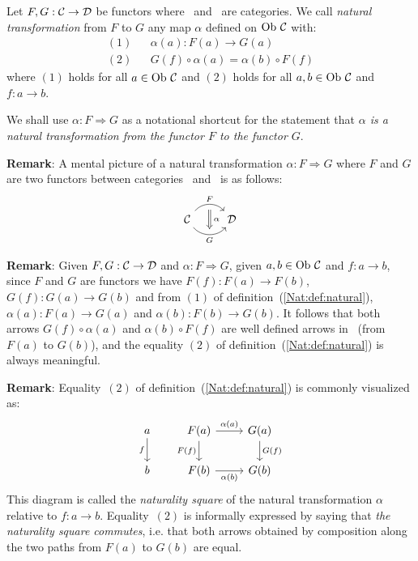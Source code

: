 \begin{defin}\label{Nat:def:natural}
    Let $F,G:\mbox{$\cal C$}\to\mbox{$\cal D$}$ be functors where \Cat\ and \Dat\ are categories.
    We call {\em natural transformation} from $F$ to $G$ any map $\alpha$
    defined on $\mbox{\rm Ob}\ \mbox{$\cal C$}$ with:
        \begin{eqnarray*}
            (1)& &\alpha(a) : F(a) \to G(a)\\
            (2)& &G(f)\circ\alpha(a) = \alpha(b) \circ F(f)
        \end{eqnarray*}
    where $(1)$ holds for all $a\in\mbox{\rm Ob}\ \mbox{$\cal C$}$ and $(2)$ holds for all 
    $a,b\in\mbox{\rm Ob}\ \mbox{$\cal C$}$ and $f:a\to b$.
\end{defin}

\begin{notation}\label{Nat:notation:natural:arrow}
    We shall use $\alpha:F\Rightarrow G$ as a notational shortcut for the
    statement that {\em $\alpha$ is a natural transformation from the
    functor $F$ to the functor $G$}.
\end{notation}

\noindent
{\bf Remark}: A mental picture of a natural transformation $\alpha:F\Rightarrow 
G$ where $F$ and $G$ are two functors between categories \Cat\ and \Dat\ is as 
follows:
    \[
        \begin{tikzcd}
            \Cat \arrow[r, "F", bend left  = 50, ""{name=U, below}]
                 \arrow[r, swap, "G", bend right = 50, ""{name=D, above}]
              & \Dat
            \arrow[Rightarrow, "\,\alpha", from = U, to = D]
        \end{tikzcd}
    \]

\noindent
{\bf Remark}: Given $F,G:\mbox{$\cal C$}\to\mbox{$\cal D$}$ and $\alpha:F\Rightarrow G$, given
$a,b\in\mbox{\rm Ob}\ \mbox{$\cal C$}$ and $f:a \to b$, since $F$ and $G$ are functors we have 
$F(f):F(a) \to F(b)$, $G(f):G(a)\to G(b)$ and from $(1)$ of 
definition~(\ref{Nat:def:natural}), $\alpha(a):F(a)\to G(a)$ and 
$\alpha(b):F(b)\to G(b)$. It follows that both arrows $G(f)\circ\alpha(a)$ 
and $\alpha(b)\circ F(f)$ are well defined arrows in \Dat\ (from $F(a)$ to 
$G(b)$), and the equality $(2)$ of definition~(\ref{Nat:def:natural}) is 
always meaningful.

\noindent
{\bf Remark}: Equality~$(2)$ of definition~(\ref{Nat:def:natural}) is commonly
visualized as: 
    \[
        \begin{tikzcd}
            a\arrow[d,swap, "f"]
            &F(a)\arrow[r, "\alpha(a)"]\arrow[d, swap,"F(f)"]
            &G(a)\arrow[d, "G(f)"]
            \\
            b
            &F(b)\arrow[r, swap, "\alpha(b)"]
            &G(b)
        \end{tikzcd}
    \]
This diagram is called the {\em naturality square} of the
natural transformation $\alpha$ relative to $f:a \to b$. Equality~$(2)$
is informally expressed by saying that {\em the naturality square commutes},
i.e. that both arrows obtained by composition along the two paths from $F(a)$ 
to $G(b)$ are equal. 

